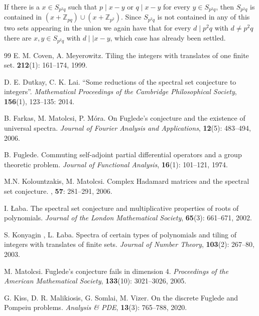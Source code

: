 \documentclass[10pt]{article}
\newcommand{\Z}{\mathbb{Z}}
\begin{document}
        If there is a $x \in S_{p^2q}$ such that $p \mid x-y$ or $q \mid x-y$ for every $y \in S_{p^2q}$, then $S_{p^2q}$ is contained in $(x+\Z_{pq}) \cup (x+\Z_{p^2})$. Since $S_{p^2q}$ is not contained in any of this two sets appearing in the union we again have that for every $d \mid p^2q$ with $d \ne p^2q$ there are $x,y \in S_{p^2q}$ with $d \mid \mid x-y$, which case has already been settled.   
\begin{thebibliography}{99}
E. M. Coven, A. Meyerowitz.
\newblock Tiling the integers with translates of one finite set.
 {\bfseries 212}(1): 161--174, 1999.

 D. E. Dutkay, C. K. Lai. 
\newblock ``Some reductions of the spectral set conjecture to integers''. 
\newblock
{\em Mathematical Proceedings of the Cambridge Philosophical Society}, \textbf{156}(1), 123--135: 2014.
            
B. Farkas, M. Matolcsi, P. M\'ora. 
\newblock
On Fuglede's conjecture and the existence of universal spectra. 
\newblock
{\em Journal of Fourier Analysis and Applications}, \textbf{12}(5): 483--494, 2006.
        
 B. Fuglede. 
\newblock
Commuting self-adjoint partial differential operators and a group theoretic problem. 
\newblock
{\em Journal of Functional Analysis}, \textbf{16}(1): 101--121, 1974.
        
M.N. Kolountzakis, M. Matolcsi. 
\newblock 
Complex Hadamard matrices and the spectral set conjecture. 
, {\bf57}: 281--291, 2006.

 I. \L aba. 
\newblock
The spectral set conjecture and multiplicative properties of roots of polynomials.
\newblock
{\em Journal of the London Mathematical Society}, \textbf{65}(3): 661--671, 2002.
        
S. Konyagin , L. \L aba. 
\newblock
Spectra of certain types of polynomials and tiling of integers with translates of finite sets. 
\newblock
{\em Journal of Number Theory}, \textbf{103}(2): 267--80, 2003.
        
        
M. Matolcsi. 
\newblock
Fuglede's conjecture fails in dimension 4. 
\newblock
{\em Proceedings of the American Mathematical Society}, \textbf{133}(10): 3021--3026, 2005.
        
G. Kiss, D. R. Malikiosis, G. Somlai, M. Vizer. 
\newblock
On the discrete Fuglede and Pompeiu problems.
\newblock 
{\em Analysis \& PDE}, \textbf{13}(3):
765--788, 2020.
         

\end{thebibliography}
\end{document}
